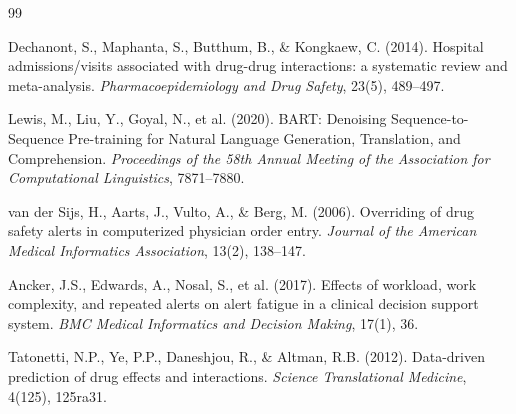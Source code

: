 \documentclass[11pt,a4paper]{article}
\begin{document}
\begin{thebibliography}{99}

Dechanont, S., Maphanta, S., Butthum, B., \& Kongkaew, C. (2014).
Hospital admissions/visits associated with drug-drug interactions: a systematic review and meta-analysis.
\textit{Pharmacoepidemiology and Drug Safety}, 23(5), 489--497.

Lewis, M., Liu, Y., Goyal, N., et al. (2020).
BART: Denoising Sequence-to-Sequence Pre-training for Natural Language Generation, Translation, and Comprehension.
\textit{Proceedings of the 58th Annual Meeting of the Association for Computational Linguistics}, 7871--7880.

van der Sijs, H., Aarts, J., Vulto, A., \& Berg, M. (2006).
Overriding of drug safety alerts in computerized physician order entry.
\textit{Journal of the American Medical Informatics Association}, 13(2), 138--147.

Ancker, J.S., Edwards, A., Nosal, S., et al. (2017).
Effects of workload, work complexity, and repeated alerts on alert fatigue in a clinical decision support system.
\textit{BMC Medical Informatics and Decision Making}, 17(1), 36.

Tatonetti, N.P., Ye, P.P., Daneshjou, R., \& Altman, R.B. (2012).
Data-driven prediction of drug effects and interactions.
\textit{Science Translational Medicine}, 4(125), 125ra31.

\end{thebibliography}
\end{document}
